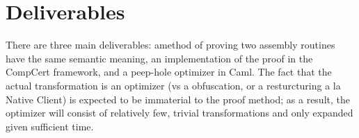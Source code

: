 \documentclass{exam}
\begin{document}
\section{Deliverables}
There are three main deliverables: amethod of proving two assembly routines
have the same semantic meaning, an implementation of the proof in the CompCert
framework, and a peep-hole optimizer in Caml.  The fact that the actual transformation
is an optimizer (vs a obfuscation, or a resturcturing a la Native Client) is expected
to be immaterial to the proof method; as a result, the optimizer will consist of
relatively few, trivial transformations and only expanded given sufficient time.
\end{document}
